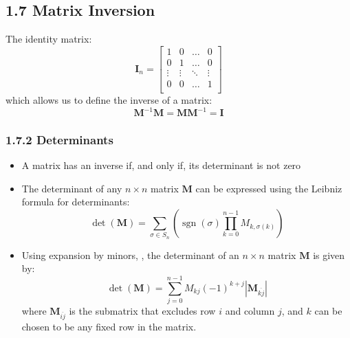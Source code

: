\documentclass[11pt]{article}
\newcommand{\bm}[1]{\mathbf{#1}}
\DeclareMathOperator{\sign}{sgn}
\begin{document}
\subsection*{1.7 Matrix Inversion}
The identity matrix:
$$
\bm{I}_n =
\begin{bmatrix}
    1 & 0 & \ldots & 0 \\
    0 & 1 & \ldots & 0 \\
    \vdots & \vdots & \ddots & \vdots \\
    0 & 0 & \ldots & 1 \\
\end{bmatrix}
$$
which allows us to define the inverse of a matrix:
\begin{equation} \bm{M}^{-1} \bm{M} = \bm{M}\bm{M}^{-1} = \bm{I} \end{equation}

\subsubsection*{1.7.2 Determinants}
\begin{itemize}
\item A matrix has an inverse if, and only if, its determinant is not zero
\item The determinant of any $n \times n$ matrix $\bm{M}$ can be expressed using the Leibniz formula for determinants:
    \begin{equation}
        \det(\bm{M}) = \sum_{\sigma \in S_n} \left( \sign \left(\sigma\right) \prod_{k=0}^{n-1} M_{k,\sigma(k)} \right)
        \label{eqn:leibniz}
    \end{equation}
\item Using expansion by minors, , the determinant of an $n \times n$
    matrix $\bm{M}$ is given by:
    \begin{equation} \label{eqn:minors}
        \det(\bm{M}) = \sum_{j=0}^{n-1} M_{kj} (-1)^{k+j} \left|\bm{M}_{\overline{kj}}\right|
    \end{equation}
    where $\bm{M}_{\overline{ij}}$ is the submatrix that excludes row $i$ and
    column $j$, and $k$ can be chosen to be any fixed row in the matrix.
\end{itemize}
\end{document}
